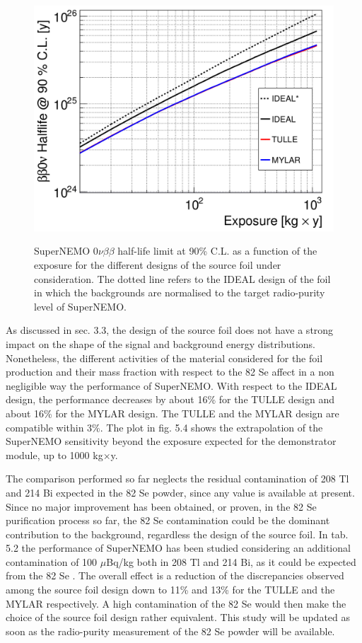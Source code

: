 \documentclass[main.tex]{subfiles}
\begin{document}
\begin{figure}[h!]
\centering
\includegraphics[scale=0.25]{pictures/Chap4/SensVsExposure3Designs.png}
\label{SensVsExposure3Designs.png}
\caption{SuperNEMO 0$\nu\beta\beta$ half-life limit at 90\% C.L. as a function of the exposure for the different designs of the source foil under consideration. The dotted line refers to the IDEAL design of the foil in which the backgrounds are normalised to the target radio-purity level of SuperNEMO.}
\end{figure}


\NI As discussed in sec. 3.3, the design of the source foil does not have a strong impact on the shape of the signal and background energy distributions. Nonetheless, the different activities of the material considered for the foil production and their mass fraction with respect to the 82 Se affect in a non negligible way the performance of SuperNEMO. With respect to the IDEAL design, the performance decreases by about 16\% for the TULLE design and about 16\% for the MYLAR design. The TULLE and the MYLAR design are compatible within 3\%. The plot in fig. 5.4 shows the extrapolation of the SuperNEMO sensitivity beyond the exposure expected for the demonstrator module, up to 1000 kg$\times$y.


\bigskip


\NI The comparison performed so far neglects the residual contamination of 208 Tl and 214 Bi expected in the 82 Se powder, since any value is available at present. Since no major improvement has been obtained, or proven, in the 82 Se purification process so far, the 82 Se contamination could be the dominant contribution to the background, regardless the design of the source foil. In tab. 5.2 the performance of SuperNEMO has been studied considering an additional contamination of 100 $\mu$Bq/kg both in 208 Tl and 214 Bi, as it could be expected from the 82 Se . The overall effect is a reduction of the discrepancies observed among the source foil design down to 11\% and 13\% for the TULLE and the MYLAR respectively. A high contamination of the 82 Se would then make the choice of the source foil design rather equivalent. This study will be updated as soon as the radio-purity measurement of the 82 Se powder will be available.
\end{document}
